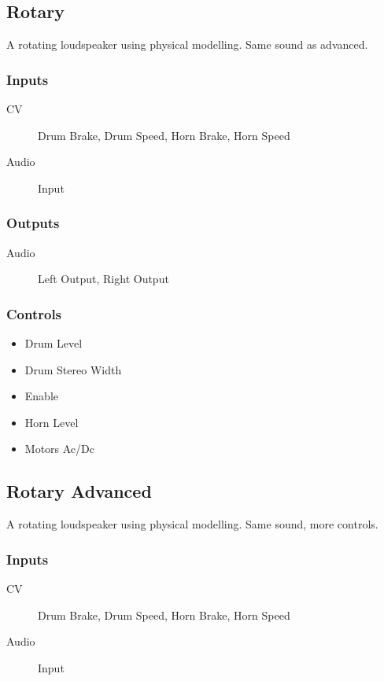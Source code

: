 \subsection{Rotary}

A rotating loudspeaker using physical modelling. Same sound as advanced.



\subsubsection{Inputs}
\begin{description}
\item [CV] Drum Brake, Drum Speed, Horn Brake, Horn Speed
\item [Audio] Input
\end{description}

\subsubsection{Outputs}
\begin{description}
\item [Audio] Left Output, Right Output
\end{description}

\subsubsection{Controls}
\begin{itemize}
\item Drum Level
\item Drum Stereo Width
\item Enable
\item Horn Level
\item Motors Ac/Dc
\end{itemize}

\subsection{Rotary Advanced}

A rotating loudspeaker using physical modelling. Same sound, more controls.



\subsubsection{Inputs}
\begin{description}
\item [CV] Drum Brake, Drum Speed, Horn Brake, Horn Speed
\item [Audio] Input
\end{description}

